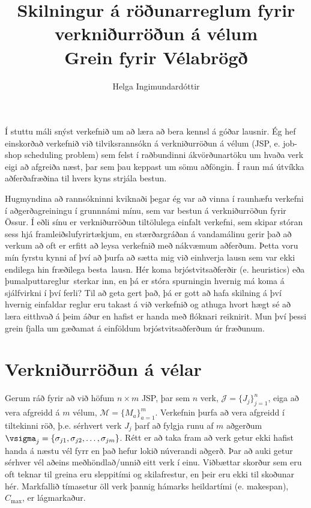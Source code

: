 \documentclass[10pt,a4paper]{article}
\title{Skilningur á röðunarreglum fyrir verkniðurröðun á vélum\\ 
    \vspace{6pt}
    \small Grein fyrir Vélabrögð} %
\author{Helga Ingimundardóttir}
\begin{document}
\maketitle


Í stuttu máli snýst verkefnið um að læra að bera kennsl á góðar lausnir. 
Ég hef einskorðað verkefnið við tilviksrannsókn á verkniðurröðun á vélum (JSP, 
e. job-shop scheduling problem) 
sem felst í raðbundinni ákvörðunartöku um hvaða verk eigi að afgreiða næst, þar 
sem þau keppast um sömu aðföngin.
Í raun má útvíkka aðferðafræðina til hvers kyns strjála bestun. 

Hugmyndina að rannsókninni kviknaði þegar ég var að vinna í raunhæfu verkefni í 
aðgerðagreiningu í grunnnámi mínu, sem var bestun á verkniðurröðun fyrir 
Össur. Í eðli sínu er verkniðurröðun tiltölulega einfalt verkefni, sem skipar 
stóran sess hjá framleiðslufyrirtækjum, en stærðargráðan á vandamálinu gerir 
það að verkum að oft er erfitt að leysa verkefnið með nákvæmum aðferðum. 
Þetta voru mín fyrstu kynni af því að þurfa að sætta mig við einhverja lausn 
sem var ekki endilega hin fræðilega \glqq besta\grqq\ lausn. 
Hér koma brjóstvitsaðferðir (e. heuristics) eða \glqq þumalputtareglur\grqq\ 
sterkar 
inn, en þá er stóra spurningin hvernig má koma á sjálfvirkni í því ferli? 
Til að geta gert það, þá er gott að hafa skilning á því hvernig einfaldar 
reglur eru takast á við verkefnið og athuga hvort hægt sé að læra eitthvað á 
þeim áður en hafist er handa með flóknari reiknirit. 
Mun því þessi grein fjalla um gæðamat á einföldum brjóstvitsaðferðum úr 
fræðunum. 

\section*{Verkniðurröðun á vélar}
Gerum ráð fyrir að við höfum $n\times m$ JSP, 
þar sem $n$ verk, $\mathcal{J}=\{J_j\}_{j=1}^n$, 
eiga að vera afgreidd á $m$ vélum, $\mathcal{M}=\{M_a\}_{a=1}^m$. 
Verkefnin þurfa að vera afgreidd í tiltekinni röð, þ.e. sérhvert verk $J_j$ 
þarf að fylgja runu af $m$ aðgerðum 
$\vsigma_j=\{\sigma_{j1},\sigma_{j2},\dotsc,\sigma_{jm}\}$. 
Rétt er að taka fram að verk getur ekki hafist handa á næstu vél fyrr en það 
hefur lokið núverandi aðgerð. 
Þar að auki getur sérhver vél aðeins meðhöndlað/unnið eitt verk í einu. 
Viðbættar skorður sem eru oft teknar til greina eru sleppitími og skilafrestur, 
en þeir eru ekki til skoðunar hér.
Markfallið tímasetur öll verk þannig hámarks heildartími (e. makespan), 
$C_{\max}$, er lágmarkaður. 
\end{document}
